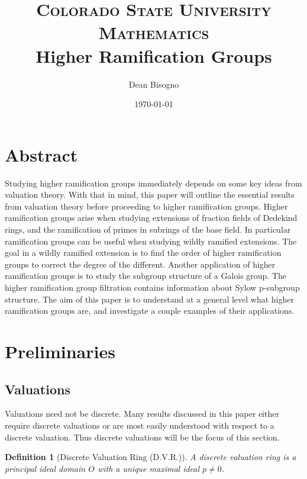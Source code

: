 \documentclass[paper=a4, fontsize=11pt]{scrartcl} %
\title{	
\normalfont \normalsize 
\textsc{Colorado State University Mathematics} \\ [25pt] %
\huge Higher Ramification Groups \\ %
}
\author{Dean Bisogno} %
\date{\normalsize\today} %
\numberwithin{equation}{section} %
\numberwithin{figure}{section} %
\numberwithin{table}{section} %
\theoremstyle{break}
\newtheorem{defn}{Definition}
\begin{document}
\maketitle %
\section{Abstract}
Studying higher ramification groups immediately depends on some key ideas from valuation theory. With that in mind, this paper will outline the essential results from valuation theory before proceeding to higher ramification groups. Higher ramification groups arise when studying extensions of fraction fields of Dedekind rings, and the ramification of primes in subrings of the base field. In particular ramification groups can be useful when studying wildly ramified extensions. The goal in a wildly ramified extension is to find the order of higher ramification groups to correct the degree of the different. Another application of higher ramification groups is to study the subgroup structure of a Galois group. The higher ramification group filtration contains information about Sylow p-subgroup structure. The aim of this paper is to understand at a general level what higher ramification groups are, and investigate a couple examples of their applications.
\section{Preliminaries}
\subsection{Valuations}
Valuations need not be discrete. Many results discussed in this paper either require discrete valuations or are most easily understood with respect to a discrete valuation. Thus discrete valuations will be the focus of this section.
\begin{defn}[Discrete Valuation Ring (D.V.R.)]
A discrete valuation ring is a principal ideal domain $O$ with a unique maximal ideal $p \not= 0$.
\end{defn}
\end{document}
